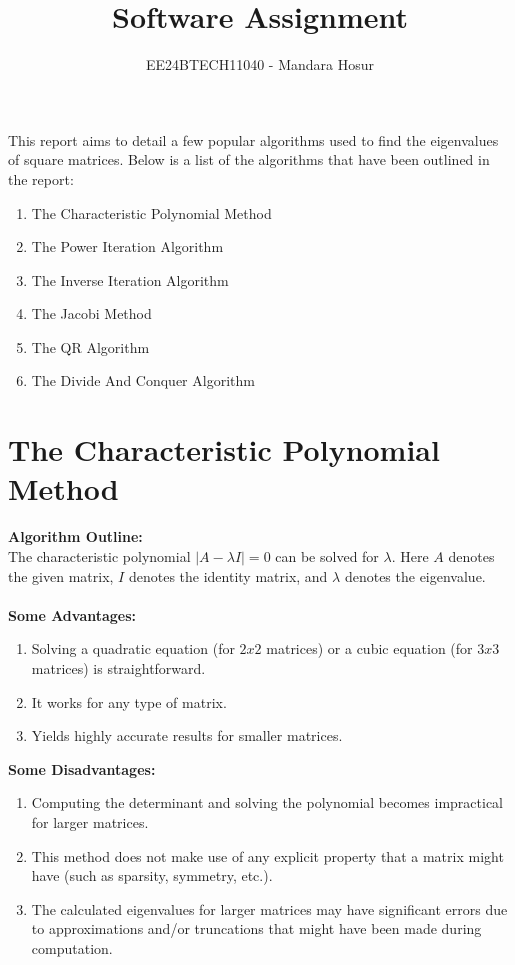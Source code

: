 \documentclass[journal,12pt,twocolumn]{IEEEtran}
\theoremstyle{remark}
\begin{document}

\vspace{3cm}

\title{Software Assignment}
\author{EE24BTECH11040 - Mandara Hosur}
\maketitle
\newpage
\bigskip

\renewcommand{\thefigure}{\theenumi}
\renewcommand{\thetable}{\theenumi}

This report aims to detail a few popular algorithms used to find the eigenvalues of square matrices. 
Below is a list of the algorithms that have been outlined in the report:
\begin{enumerate}
\item The Characteristic Polynomial Method
\item The Power Iteration Algorithm
\item The Inverse Iteration Algorithm
\item The Jacobi Method
\item The QR Algorithm
\item The Divide And Conquer Algorithm
\end{enumerate}

\section{The Characteristic Polynomial Method}
\textbf{Algorithm Outline:}
\\
The characteristic polynomial $|A-\lambda I| = 0$ can be solved for $\lambda$. Here $A$ denotes the given matrix, $I$ denotes the identity matrix, and $\lambda$ denotes the eigenvalue.
\\ \\
\textbf{Some Advantages:}
\begin{enumerate}
\item Solving a quadratic equation (for $2x2$ matrices) or a cubic equation (for $3x3$ matrices) is straightforward.
\item It works for any type of matrix.
\item Yields highly accurate results for smaller matrices.
\end{enumerate}
\textbf{Some Disadvantages:}
\begin{enumerate}
\item Computing the determinant and solving the polynomial becomes impractical for larger matrices.
\item This method does not make use of any explicit property that a matrix might have (such as sparsity, symmetry, etc.).
\item The calculated eigenvalues for larger matrices may have significant errors due to approximations and/or truncations that might have been made during computation. 
\end{enumerate}
\end{document}
